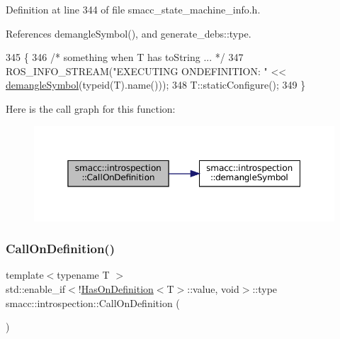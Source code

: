 Definition at line 344 of file smacc\+\_\+state\+\_\+machine\+\_\+info.\+h.



References demangle\+Symbol(), and generate\+\_\+debs\+::type.


\begin{DoxyCode}
345 \{
346     \textcolor{comment}{/* something when T has toString ... */}
347     ROS\_INFO\_STREAM(\textcolor{stringliteral}{"EXECUTING ONDEFINITION: "} << \hyperlink{namespacesmacc_1_1introspection_a2f495108db3e57604d8d3ff5ef030302}{demangleSymbol}(\textcolor{keyword}{typeid}(T).name()));
348     T::staticConfigure();
349 \}
\end{DoxyCode}
Here is the call graph for this function\+:
\nopagebreak
\begin{figure}[H]
\begin{center}
\leavevmode
\includegraphics[width=350pt]{namespacesmacc_1_1introspection_a14a28bfad794e98164dce1375d3b0796_cgraph}
\end{center}
\end{figure}
\mbox{\label{namespacesmacc_1_1introspection_a8cfcfc9c8896a6ff4bf22dbce6ecf838}} 
\subsubsection{\texorpdfstring{Call\+On\+Definition()}{CallOnDefinition()}\hspace{0.1cm}{\footnotesize\ttfamily [2/2]}}
{\footnotesize\ttfamily template$<$typename T $>$ \\
std\+::enable\+\_\+if$<$!\hyperlink{classsmacc_1_1introspection_1_1HasOnDefinition}{Has\+On\+Definition}$<$T$>$\+::value, void$>$\+::type smacc\+::introspection\+::\+Call\+On\+Definition (\begin{DoxyParamCaption}{ }\end{DoxyParamCaption})}



